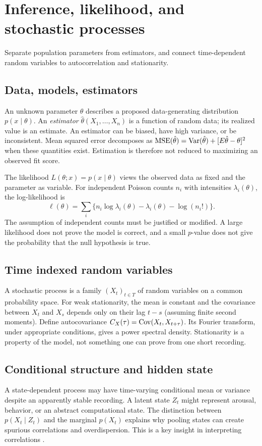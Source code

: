 \chapter{Inference, likelihood, and stochastic processes}\label{ch:stochastic}
\begin{readergoal}Separate population parameters from estimators, and connect time-dependent random variables to autocorrelation and stationarity.\end{readergoal}
\section{Data, models, estimators}
An unknown parameter $\theta$ describes a proposed data-generating distribution $p(x\mid\theta)$. An \emph{estimator} $\hat\theta(X_1,\ldots,X_n)$ is a function of random data; its realized value is an estimate. An estimator can be biased, have high variance, or be inconsistent. Mean squared error decomposes as $\mathrm{MSE}(\hat\theta)=\operatorname{Var}(\hat\theta)+[E\hat\theta-\theta]^2$ when these quantities exist. Estimation is therefore not reduced to maximizing an observed fit score.

The likelihood $L(\theta;x)=p(x\mid\theta)$ views the observed data as fixed and the parameter as variable. For independent Poisson counts $n_i$ with intensities $\lambda_i(\theta)$, the log-likelihood is
\[\ell(\theta)=\sum_i\{n_i\log\lambda_i(\theta)-\lambda_i(\theta)-\log(n_i!)\}.\]
The assumption of independent counts must be justified or modified. A large likelihood does not prove the model is correct, and a small $p$-value does not give the probability that the null hypothesis is true.

\section{Time indexed random variables}
A stochastic process is a family $(X_t)_{t\in T}$ of random variables on a common probability space. For weak stationarity, the mean is constant and the covariance between $X_t$ and $X_s$ depends only on their lag $t-s$ (assuming finite second moments). Define autocovariance $C_X(\tau)=\operatorname{Cov}(X_t,X_{t+\tau})$. Its Fourier transform, under appropriate conditions, gives a power spectral density. Stationarity is a property of the model, not something one can prove from one short recording.

\section{Conditional structure and hidden state}
A state-dependent process may have time-varying conditional mean or variance despite an apparently stable recording. A latent state $Z_t$ might represent arousal, behavior, or an abstract computational state. The distinction between $p(X_t\mid Z_t)$ and the marginal $p(X_t)$ explains why pooling states can create spurious correlations and overdispersion. This is a key insight in interpreting correlations \cite{CohenKohn2011,Goris2014}.


